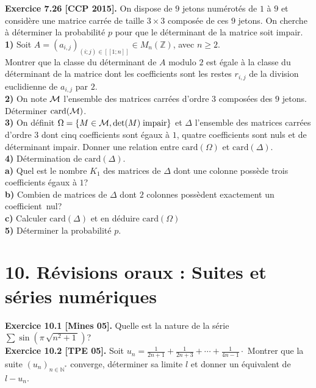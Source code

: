 \documentclass[a4paper,12pt,francais]{article}
\newcommand{\field}[1]{\mathbb{#1}}
\newcommand{\N}{\field{N}}
\newcommand{\Z}{\field{Z}}
\newcommand{\card}{\mbox{card}}
\begin{document}
\noindent
{\bf Exercice 7.26 [CCP 2015].} 
On dispose de $9$ jetons numérotés de $1$ à $9$ et considère une matrice carrée de taille $3 \times 3$ composée de ces $9$ jetons.
On cherche à déterminer la probabilité $p$ pour que le déterminant de la matrice soit impair.\\
{\bf 1)} Soit $A=(a_{i,j})_{(i;j)\in [\![1;n]\!]} \in M_n(\Z)$, avec $n \geqslant 2$.\\
Montrer que la classe du déterminant de $A$ modulo $2$ est égale à la classe du déterminant de la matrice dont les coefficients sont les restes $r_{i,j}$ de la division euclidienne de $a_{i,j}$ par $2$.\\
{\bf 2)} On note $\cal{M}$ l'ensemble des matrices carrées d'ordre $3$ composées des $9$ jetons.
Déterminer $\card({\cal{M}})$.\\
{\bf 3)} On définit $\Omega =\{
M \in {\cal{M}}, \det(M) \; {\rm impair} \}$ et $\Delta$ l'ensemble des matrices carrées d'ordre $3$ dont cinq coefficients sont égaux à $1$, quatre coefficients sont nuls et de déterminant impair.
Donner une relation entre $\card(\Omega)$ et $\card(\Delta)$.\\
{\bf 4)} Détermination de $\card(\Delta)$.\\
\indent
{\bf a)} Quel est le nombre $K_1$ des matrices de $\Delta$ dont une colonne possède trois coefficients égaux à $1$?\\
\indent
{\bf b)} Combien de matrices de $\Delta$ dont $2$  colonnes possèdent exactement un coefficient~nul?\\
\indent
{\bf c)} Calculer $\card(\Delta)$ et en déduire $\card(\Omega)$\\
{\bf 5)} Déterminer la probabilité $p$.\\



\newpage
\section*{10. Révisions oraux : Suites et séries numériques} %


\noindent
{\bf Exercice 10.1 [Mines 05].} Quelle est la nature de la série $\sum
\sin(\pi \, \sqrt{n^2+1\,})$?\\

\noindent
{\bf Exercice 10.2 [TPE 05].} Soit
$u_n=\frac{1}{2n+1}+\frac{1}{2n+3}+\cdots +\frac{1}{4n-1}\cdot$
Montrer que la suite $(u_n)_{n \in \N^*}$ converge, déterminer sa
limite $l$ et donner un équivalent de $l-u_n$.\\
\end{document}
